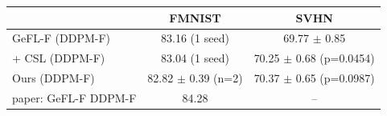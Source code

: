 \begin{tabular}{lcc}
\toprule
 & FMNIST & SVHN \\
\midrule
GeFL-F (DDPM-F) & 83.16 (1 seed) & 69.77 $\pm$ 0.85 \\
+ CSL (DDPM-F) & 83.04 (1 seed) & 70.25 $\pm$ 0.68 (p=0.0454) \\
Ours (DDPM-F) & 82.82 $\pm$ 0.39 (n=2) & 70.37 $\pm$ 0.65 (p=0.0987) \\
paper: GeFL-F DDPM-F & 84.28 & -- \\
\bottomrule
\end{tabular}
